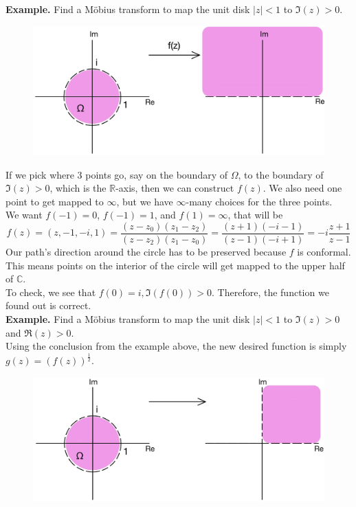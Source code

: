 \documentclass[11pt]{article}
\begin{document}
\textbf{Example.} Find a Möbius transform to map the unit disk $|z| < 1$ to $\Im(z) > 0$. \\
\begin{figure}[H]
\includegraphics[scale = 0.2]{10_1}
\centering
\end{figure}
If we pick where 3 points go, say on the boundary of $\Omega$, to the boundary of $\Im(z) > 0$, which is the $\mathbb{R}$-axis, then we can construct $f(z)$. We also need one point to get mapped to $\infty$, but we have $\infty$-many choices for the three points. \\
We want $f(-1) = 0$, $f(-1) = 1$, and $f(1) = \infty$, that will be 
$$f(z) = (z, -1, -i, 1) = \frac{(z - z_0)(z_1 - z_2)}{(z - z_2)(z_1 - z_0)} = \frac{(z + 1)(-i - 1)}{(z - 1)(-i + 1)} = -i\frac{z + 1}{z - 1}$$
Our path's direction around the circle has to be preserved because $f$ is conformal. \\
This means points on the interior of the circle will get mapped to the upper half of $\mathbb{C}$. \\
To check, we see that $f(0) = i, \Im(f(0)) > 0$. Therefore, the function we found out is correct. \\
\newline
\textbf{Example.} Find a Möbius transform to map the unit disk $|z| < 1$ to $\Im(z) > 0$ and $\Re(z) > 0$. \\
Using the conclusion from the example above, the new desired function is simply 
$g(z) = (f(z))^{\frac{1}{2}}$.
\begin{figure}[H]
\includegraphics[scale = 0.2]{10_2}
\centering
\end{figure}
\end{document}
